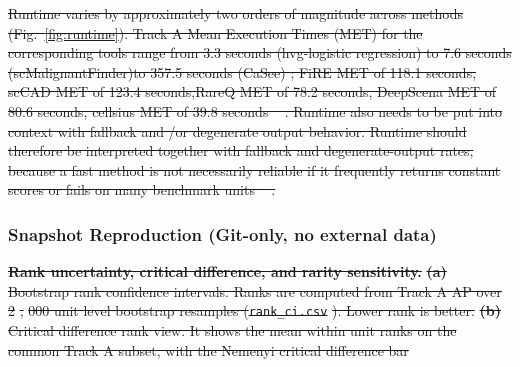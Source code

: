 \documentclass[10pt]{article}
\providecommand{\DIFaddtex}[1]{{\protect\color{trackgreen}#1}} %
\providecommand{\DIFdeltex}[1]{{\protect\color{red}\sout{#1}}}                      %
\providecommand{\DIFaddbegin}{} %
\providecommand{\DIFaddend}{} %
\providecommand{\DIFdelbegin}{} %
\providecommand{\DIFdelend}{} %
\providecommand{\DIFdelFL}[1]{\DIFdel{#1}} %
\providecommand{\DIFaddbeginFL}{} %
\providecommand{\DIFdelendFL}{} %
\providecommand{\DIFadd}[1]{\texorpdfstring{\DIFaddtex{#1}}{#1}} %
\providecommand{\DIFdel}[1]{\texorpdfstring{\DIFdeltex{#1}}{}} %
\newcommand{\DIFscaledelfig}{0.5}
\newlength{\DIFdelgraphicswidth} %
\newlength{\DIFdelgraphicsheight} %
\newcommand{\DIFaddincludegraphics}[2][]{{\color{trackgreen}\fbox{\DIFOincludegraphics[#1]{#2}}}} %
\newcommand{\DIFdelincludegraphics}[2][]{%
\sbox{\DIFdelgraphicsbox}{\DIFOincludegraphics[#1]{#2}}%
\settoboxwidth{\DIFdelgraphicswidth}{\DIFdelgraphicsbox} %
\settoboxtotalheight{\DIFdelgraphicsheight}{\DIFdelgraphicsbox} %
\scalebox{\DIFscaledelfig}{%
\parbox[b]{\DIFdelgraphicswidth}{\usebox{\DIFdelgraphicsbox}\\[-\baselineskip] \rule{\DIFdelgraphicswidth}{0em}}\llap{\resizebox{\DIFdelgraphicswidth}{\DIFdelgraphicsheight}{%
\setlength{\unitlength}{\DIFdelgraphicswidth}%
\begin{picture}(1,1)%
\thicklines\linethickness{2pt} %
{\color[rgb]{1,0,0}\put(0,0){\framebox(1,1){}}}%
{\color[rgb]{1,0,0}\put(0,0){\line( 1,1){1}}}%
{\color[rgb]{1,0,0}\put(0,1){\line(1,-1){1}}}%
\end{picture}%
}\hspace*{3pt}}} %
} %
\DeclareRobustCommand{\DIFaddbegin}{\DIFOaddbegin \let\includegraphics\DIFaddincludegraphics} %
\DeclareRobustCommand{\DIFaddend}{\DIFOaddend \let\includegraphics\DIFOincludegraphics} %
\DeclareRobustCommand{\DIFdelbegin}{\DIFOdelbegin \let\includegraphics\DIFdelincludegraphics} %
\DeclareRobustCommand{\DIFdelend}{\DIFOaddend \let\includegraphics\DIFOincludegraphics} %
\DeclareRobustCommand{\DIFaddbeginFL}{\DIFOaddbeginFL \let\includegraphics\DIFaddincludegraphics} %
\DeclareRobustCommand{\DIFdelendFL}{\DIFOaddendFL \let\includegraphics\DIFOincludegraphics} %
\begin{document}
\DIFdelbegin \DIFdel{Runtime varies by approximately two orders of magnitude across methods (Fig.~\ref{fig:runtime}). Track A Mean Execution Times (MET) for the corresponding tools range from 3.3 seconds (hvg-logistic regression) to 7.6 seconds (scMalignantFinder)to 357.5 seconds (CaSee)
  ; FiRE MET of 118.1 seconds, scCAD MET of 123.4 seconds,RareQ MET of 78.2 seconds,
  DeepScena MET of 80.6 seconds,
  cellsius MET of 39.8 seconds \mbox{%
\cite{brendel2022application,wang2022comparison}}\hskip0pt%
. Runtime also needs to be put into context with fallback and /or degenerate output behavior. Runtime should therefore be interpreted together with fallback and degenerate-output rates, because a fast method is not necessarily reliable if it frequently returns constant scores or fails on many benchmark units \mbox{%
\cite{everingham2010pascal,tran2020benchmark}}\hskip0pt%
.
}\DIFdelend \DIFaddbegin \subsubsection{\DIFadd{Snapshot Reproduction (Git-only, no external
data)}}\label{snapshot-reproduction-git-only-no-external-data}
\DIFaddend 

\DIFdelbegin %
\textbf{\DIFdelFL{Rank uncertainty, critical difference, and rarity sensitivity.}}%
\textbf{\DIFdelFL{(a)}} %
\DIFdelFL{Bootstrap rank confidence intervals. Ranks are computed from Track A AP over 2}%
\DIFdelFL{,}%
\DIFdelFL{000 unit level bootstrap resamples (}\texttt{\DIFdelFL{rank\_ci.csv}}%
\DIFdelFL{). Lower rank is better. }\textbf{\DIFdelFL{(b)}} %
\DIFdelFL{Critical difference rank view. It shows the mean within unit ranks on the common Track A subset, with the Nemenyi critical difference bar }\DIFdelendFL \DIFaddbeginFL \begin{Shaded}
\begin{Highlighting}[]
  
\end{Highlighting}
\end{Shaded}
\end{document}
